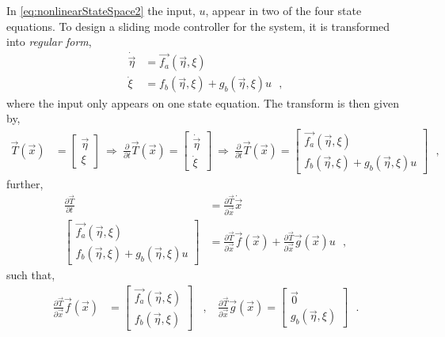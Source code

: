 In \autoref{eq:nonlinearStateSpace2} the input, $u$, appear in two of the four state equations. To design a sliding mode controller for the system, it is transformed into \textit{regular form}, 
\begin{align}
\dot{\vec{\eta}} &=  \vec{f_a}(\vec{\eta},\xi) \nonumber   \\
\dot{\xi}        &=  f_b(\vec{\eta},\xi) + g_b(\vec{\eta},\xi) u    \ \ \ ,
\label{eq:regularForm}
\end{align}
%
where the input only appears on one state equation.
The transform is then given by,
\begin{align}
  \vec{T}(\vec{x}) &=
  \begin{bmatrix}
    \vec{\eta} \\
    \xi
  \end{bmatrix}
  \ \Rightarrow \ 
  \frac{\partial}{\partial t}\vec{T}(\vec{x})
  =
  \begin{bmatrix}
    \dot{\vec{\eta}} \\
    \dot{\xi}
  \end{bmatrix}
  \ \Rightarrow \ 
  \frac{\partial}{\partial t}\vec{T}(\vec{x})
  =
  \begin{bmatrix}
    \vec{f_a}(\vec{\eta},\xi)         \\
    f_b(\vec{\eta},\xi) + g_b(\vec{\eta},\xi) u
  \end{bmatrix}
   \ \ \ ,
  \label{eq:transformAndDerivative}
\end{align}
further,
\begin{align}
  \frac{\partial \vec{T}}{\partial t} &= \frac{\partial \vec{T}}{\partial \vec{x}}  \dot{\vec{x}} \\
  \begin{bmatrix}
    \vec{f_a}(\vec{\eta},\xi)         \\
    f_b(\vec{\eta},\xi) + g_b(\vec{\eta},\xi) u
  \end{bmatrix}
  &=
  \frac{\partial \vec{T}}{\partial \vec{x}} \vec{f}(\vec{x}) + \frac{\partial \vec{T}}{\partial \vec{x}} \vec{g}(\vec{x}) u
  \ \ \ ,
  \label{eq:transformDerivative}
\end{align}
such that,
\begin{align}
  \frac{\partial \vec{T}}{\partial \vec{x}} \vec{f}(\vec{x})    
  &= 
  \begin{bmatrix}
    \vec{f_a}(\vec{\eta},\xi)       \\
    f_b(\vec{\eta},\xi)
  \end{bmatrix}  \ \ \ \ ,\ \ \ \ 
  \frac{\partial \vec{T}}{\partial \vec{x}} \vec{g}(\vec{x})
  = 
  \begin{bmatrix}
    \vec{0}        \\
    g_b(\vec{\eta},\xi)
  \end{bmatrix}
  \ \ \ .
  \label{eq:transformXDerivative}
\end{align}
